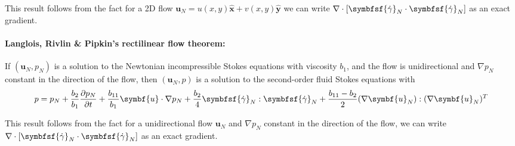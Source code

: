 \documentclass{jknotes}
\begin{document}
This result follows from the fact for a 2D flow $\symbf{u}_N = u(x,y)\hat{\symbf{x}} +
v(x,y) \hat{\symbf{y}}$ we can write $\nabla \cdot \left[ \symbfsf{\srate}_N
\cdot \symbfsf{\srate}_N\right]$ as an exact gradient.

\paragraph{Langlois, Rivlin \& Pipkin's rectilinear flow theorem:} If
$(\symbf{u}_N, p_N)$ is a solution to the Newtonian incompressible Stokes
equations with viscosity $b_1$, and the flow is unidirectional and $\nabla
p_N$ constant in the direction of the flow, then $(\symbf{u}_N, p)$ is a
solution to the second-order fluid Stokes equations with
\begin{equation}
	p = p_N + \frac{b_2}{b_1} \frac{\partial p_N}{\partial t} +
	\frac{b_{11}}{b_1} \symbf{u} \cdot \nabla p_N + \frac{b_2}{4}
	\symbfsf{\srate}_N : \symbfsf{\srate}_N + \frac{b_{11}-b_2}{2} (\nabla
	\symbf{u}_N) : (\nabla \symbf{u}_N)^T
\end{equation}

This result follows from the fact for a unidirectional flow $\symbf{u}_N$ and
$\nabla p_N$ constant in the direction of the flow, we can write $\nabla \cdot
\left[ \symbfsf{\srate}_N \cdot \symbfsf{\srate}_N\right]$ as an exact
gradient.

\end{document}
